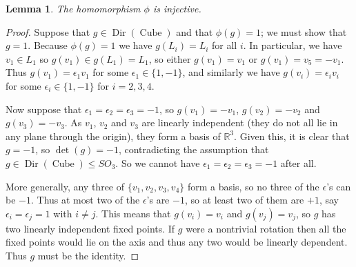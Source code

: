 \documentclass{amsart}
\DeclareMathOperator{\Cube}     {Cube}
\DeclareMathOperator{\Dir}      {Dir}
\newcommand{\R}         {{\mathbb{R}}}
\newcommand{\ep}        {\epsilon}
\renewcommand{\:}{\colon}
\newtheorem{lemma}[theorem]{Lemma}
\theoremstyle{definition}
\begin{document}
\begin{lemma}
 The homomorphism $\phi$ is injective.
\end{lemma}
\begin{proof}
 Suppose that $g\in\Dir(\Cube)$ and that $\phi(g)=1$; we must show
 that $g=1$.  Because $\phi(g)=1$ we have $g(L_i)=L_i$ for all $i$.
 In particular, we have $v_1\in L_1$ so $g(v_1)\in g(L_1)=L_1$, so
 either $g(v_1)=v_1$ or $g(v_1)=v_5=-v_1$.  Thus $g(v_1)=\ep_1v_1$ for
 some $\ep_1\in\{1,-1\}$, and similarly we have $g(v_i)=\ep_iv_i$ for
 some $\ep_i\in\{1,-1\}$ for $i=2,3,4$.

 Now suppose that $\ep_1=\ep_2=\ep_3=-1$, so $g(v_1)=-v_1$,
 $g(v_2)=-v_2$ and $g(v_3)=-v_3$.  As $v_1$, $v_2$ and $v_3$ are
 linearly independent (they do not all lie in any plane through the
 origin), they form a basis of $\R^3$.  Given this, it is clear that
 $g=-1$, so $\det(g)=-1$, contradicting the assumption that
 $g\in\Dir(\Cube)\leq SO_3$.  So we cannot have $\ep_1=\ep_2=\ep_3=-1$
 after all.

 More generally, any three of $\{v_1,v_2,v_3,v_4\}$ form a basis, so
 no three of the $\ep$'s can be $-1$.  Thus at most two of the $\ep$'s
 are $-1$, so at least two of them are $+1$, say $\ep_i=\ep_j=1$ with
 $i\neq j$.  This means that $g(v_i)=v_i$ and $g(v_j)=v_j$, so $g$ has
 two linearly independent fixed points.  If $g$ were a nontrivial
 rotation then all the fixed points would lie on the axis and thus
 any two would be linearly dependent.  Thus $g$ must be the identity.
\end{proof}
\end{document}

